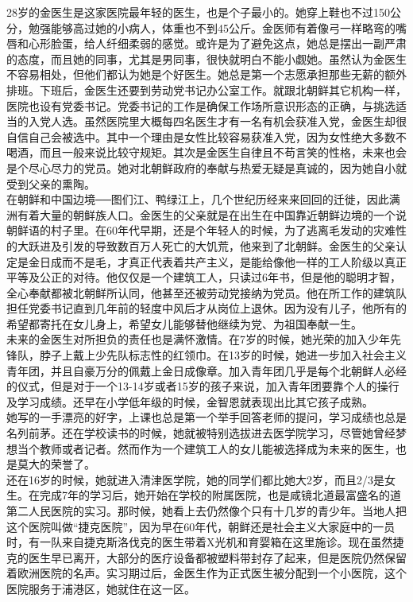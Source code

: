 28岁的金医生是这家医院最年轻的医生，也是个子最小的。她穿上鞋也不过150公分，勉强能够高过她的小病人，体重也不到45公斤。金医师有着像弓一样略弯的嘴唇和心形脸蛋，给人纤细柔弱的感觉。或许是为了避免这点，她总是摆出一副严肃的态度，而且她的同事，尤其是男同事，很快就明白不能小觑她。虽然认为金医生不容易相处，但他们都认为她是个好医生。她总是第一个志愿承担那些无薪的额外排班。下班后，金医生还要到劳动党书记办公室工作。就跟北朝鲜其它机构一样，医院也设有党委书记。党委书记的工作是确保工作场所意识形态的正确，与挑选适当的入党人选。虽然医院里大概每四名医生才有一名有机会获准入党，金医生却很自信自己会被选中。其中一个理由是女性比较容易获准入党，因为女性绝大多数不喝酒，而且一般来说比较守规矩。其次是金医生自律且不苟言笑的性格，未来也会是个尽心尽力的党员。她对北朝鲜政府的奉献与热爱无疑是真诚的，因为她自小就受到父亲的熏陶。\\

在朝鲜和中国边境──图们江、鸭绿江上，几个世纪历经来来回回的迁徙，因此满洲有着大量的朝鲜族人口。金医生的父亲就是在出生在中国靠近朝鲜边境的一个说朝鲜语的村子里。在60年代早期，还是个年轻人的时候，为了逃离毛发动的灾难性的大跃进及引发的导致数百万人死亡的大饥荒，他来到了北朝鲜。金医生的父亲认定是金日成而不是毛，才真正代表着共产主义，是能给像他一样的工人阶级以真正平等及公正的对待。他仅仅是一个建筑工人，只读过6年书，但是他的聪明才智，全心奉献都被北朝鲜所认同，他甚至还被劳动党接纳为党员。他在所工作的建筑队担任党委书记直到几年前的轻度中风后才从岗位上退休。因为没有儿子，他所有的希望都寄托在女儿身上，希望女儿能够替他继续为党、为祖国奉献一生。\\

未来的金医生对所担负的责任也是满怀激情。在7岁的时候，她光荣的加入少年先锋队，脖子上戴上少先队标志性的红领巾。在13岁的时候，她进一步加入社会主义青年团，并且自豪万分的佩戴上金日成像章。加入青年团几乎是每个北朝鲜人必经的仪式，但是对于一个13-14岁或者15岁的孩子来说，加入青年团要靠个人的操行及学习成绩。还早在小学低年级的时候，金智恩就表现出比其它孩子成熟。\\

她写的一手漂亮的好字，上课也总是第一个举手回答老师的提问，学习成绩也总是名列前茅。还在学校读书的时候，她就被特别选拔进去医学院学习，尽管她曾经梦想当个教师或者记者。然而作为一个建筑工人的女儿能被选择成为未来的医生，也是莫大的荣誉了。\\

还在16岁的时候，她就进入清津医学院，她的同学们都比她大2岁，而且2/3是女生。在完成7年的学习后，她开始在学校的附属医院，也是咸镜北道最富盛名的道第二人民医院的实习。那时候，她看上去仍然像个只有十几岁的青少年。当地人把这个医院叫做“捷克医院”，因为早在60年代，朝鲜还是社会主义大家庭中的一员时，有一队来自捷克斯洛伐克的医生带着X光机和育婴箱在这里施诊。现在虽然捷克的医生早已离开，大部分的医疗设备都被塑料带封存了起来，但是医院仍然保留着欧洲医院的名声。实习期过后，金医生作为正式医生被分配到一个小医院，这个医院服务于浦港区，她就住在这一区。\\

